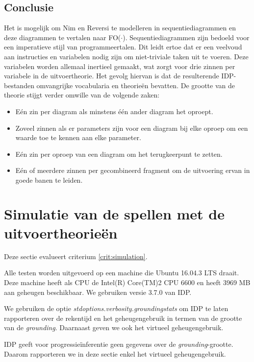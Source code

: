 \subsection{Conclusie}\label{sec:design-conclusion}

Het is mogelijk om Nim en Reversi te modelleren in sequentiediagrammen en deze diagrammen te vertalen naar FO($\cdot$). Sequentiediagrammen zijn bedoeld voor een imperatieve stijl van programmeertalen. Dit leidt ertoe dat er een veelvoud aan instructies en variabelen nodig zijn om niet-triviale taken uit te voeren. Deze variabelen worden allemaal inertieel gemaakt, wat zorgt voor drie zinnen per variabele in de uitvoertheorie. Het gevolg hiervan is dat de resulterende IDP-bestanden omvangrijke vocabularia en theorie\"en bevatten. De grootte van de theorie stijgt verder omwille van de volgende zaken:

\begin{itemize}
	\item E\'en zin per diagram als minstens \'e\'en ander diagram het oproept.
	\item Zoveel zinnen als er parameters zijn voor een diagram bij elke oproep om een waarde toe te kennen aan elke parameter.
	\item E\'en zin per oproep van een diagram om het terugkeerpunt te zetten.
	\item E\'en of meerdere zinnen per gecombineerd fragment om de uitvoering ervan in goede banen te leiden.
\end{itemize}

\section{Simulatie van de spellen met de uitvoertheorie\"en}

Deze sectie evalueert criterium \ref{crit:simulation}.

Alle testen worden uitgevoerd op een machine die Ubuntu 16.04.3 LTS draait. Deze machine heeft als CPU de Intel(R) Core(TM)2 CPU 6600 en heeft 3969 MB aan geheugen beschikbaar. We gebruiken versie 3.7.0 van IDP.

We gebruiken de optie \textit{stdoptions.verbosity.groundingstats} om IDP te laten rapporteren over de rekentijd en het geheugengebruik in termen van de grootte van de \textit{grounding}\cite{DeCatBroes2014PLaa}. Daarnaast geven we ook het virtueel geheugengebruik.

IDP geeft voor progressie\"inferentie geen gegevens over de \textit{grounding}-grootte. Daarom rapporteren we in deze sectie enkel het virtueel geheugengebruik.

